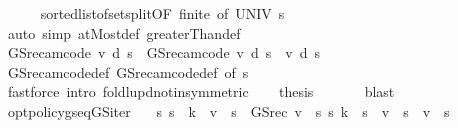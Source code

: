 \begin{isabellebody}
\ \ \ \ \isamarkupfalse%
\ sorted{\isacharunderscore}{\kern0pt}list{\isacharunderscore}{\kern0pt}of{\isacharunderscore}{\kern0pt}set{\isacharunderscore}{\kern0pt}split{\isacharprime}{\kern0pt}{\isacharbrackleft}{\kern0pt}OF\ finite{\isacharcomma}{\kern0pt}\ of\ UNIV\ s{\isacharbrackright}{\kern0pt}\isanewline
\ \ \ \ \isamarkupfalse%
\ {\isacharparenleft}{\kern0pt}auto\ simp{\isacharcolon}{\kern0pt}\ atMost{\isacharunderscore}{\kern0pt}def\ greaterThan{\isacharunderscore}{\kern0pt}def{\isacharparenright}{\kern0pt}\isanewline
\ \ \isamarkupfalse%
\ {\isachardoublequoteopen}GS{\isacharunderscore}{\kern0pt}rec{\isacharunderscore}{\kern0pt}am{\isacharunderscore}{\kern0pt}code\ v\ d\ s\ {\isacharequal}{\kern0pt}\ GS{\isacharunderscore}{\kern0pt}rec{\isacharunderscore}{\kern0pt}am{\isacharunderscore}{\kern0pt}code{\isacharprime}{\kern0pt}\ v\ d\ s{\isachardoublequoteclose}\ \ v\ d\ s\isanewline
\ \ \ \ \isamarkupfalse%
\ GS{\isacharunderscore}{\kern0pt}rec{\isacharunderscore}{\kern0pt}am{\isacharunderscore}{\kern0pt}code{\isacharunderscore}{\kern0pt}def\ GS{\isacharunderscore}{\kern0pt}rec{\isacharunderscore}{\kern0pt}am{\isacharunderscore}{\kern0pt}code{\isacharprime}{\kern0pt}{\isacharunderscore}{\kern0pt}def\ {\isacharasterisk}{\kern0pt}{\isacharbrackleft}{\kern0pt}of\ s{\isacharbrackright}{\kern0pt}\isanewline
\ \ \ \ \isamarkupfalse%
\ {\isacharparenleft}{\kern0pt}fastforce\ intro{\isacharbang}{\kern0pt}{\isacharcolon}{\kern0pt}\ foldl{\isacharunderscore}{\kern0pt}upd{\isacharunderscore}{\kern0pt}notin{\isacharprime}{\kern0pt}{\isacharbrackleft}{\kern0pt}symmetric{\isacharbrackright}{\kern0pt}{\isacharparenright}{\kern0pt}\isanewline
\ \ \isamarkupfalse%
\ {\isacharquery}{\kern0pt}thesis\ \isanewline
\ \ \ \ \isamarkupfalse%
\ blast\isanewline
{}\isamarkupfalse%
%
\endisatagproof
{\isafoldproof}%
%
\isadelimproof
\isanewline
%
\endisadelimproof
\isanewline
{}\isamarkupfalse%
\ opt{\isacharunderscore}{\kern0pt}policy{\isacharunderscore}{\kern0pt}gs{\isacharprime}{\kern0pt}{\isacharunderscore}{\kern0pt}eq{\isacharunderscore}{\kern0pt}GS{\isacharunderscore}{\kern0pt}iter{\isacharcolon}{\kern0pt}\isanewline
\ \ \ {\isachardoublequoteopen}{\isasymAnd}s{\isachardot}{\kern0pt}\ s\ {\isacharless}{\kern0pt}\ k\ {\isasymLongrightarrow}\ v{\isacharprime}{\kern0pt}\ {\isachardollar}{\kern0pt}\ s\ {\isacharequal}{\kern0pt}\ GS{\isacharunderscore}{\kern0pt}rec\ v\ {\isachardollar}{\kern0pt}\ s{\isachardoublequoteclose}\ {\isachardoublequoteopen}{\isasymAnd}s{\isachardot}{\kern0pt}\ k\ {\isasymle}\ s\ {\isasymLongrightarrow}\ v{\isacharprime}{\kern0pt}\ {\isachardollar}{\kern0pt}\ s\ {\isacharequal}{\kern0pt}\ v\ {\isachardollar}{\kern0pt}\ s{\isachardoublequoteclose}\isanewline

\end{isabellebody}
